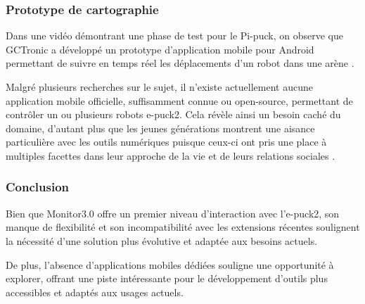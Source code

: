 \subsubsection{Prototype de cartographie}
Dans une vidéo démontrant une phase de test pour le Pi-puck, on observe que GCTronic a développé un prototype d'application mobile pour Android permettant de suivre en temps réel les déplacements d'un robot dans une arène \autocite{gctronic_pi-puck_nodate}.

Malgré plusieurs recherches sur le sujet, il n'existe actuellement aucune application mobile officielle, suffisamment connue ou open-source, permettant de contrôler un ou plusieurs robots e-puck2.
Cela révèle ainsi un besoin caché du domaine, d'autant plus que les jeunes générations montrent une aisance particulière avec les outils numériques puisque ceux-ci ont pris une place à multiples facettes dans leur approche de la vie et de leurs relations sociales \autocite{tully_growing_2003}.

\subsubsection{Conclusion}
Bien que Monitor3.0 offre un premier niveau d'interaction avec l'e-puck2, son manque de flexibilité et son incompatibilité avec les extensions récentes soulignent la nécessité d'une solution plus évolutive et adaptée aux besoins actuels.

De plus, l'absence d'applications mobiles dédiées souligne une opportunité à explorer, offrant une piste intéressante pour le développement d'outils plus accessibles et adaptés aux usages actuels.
